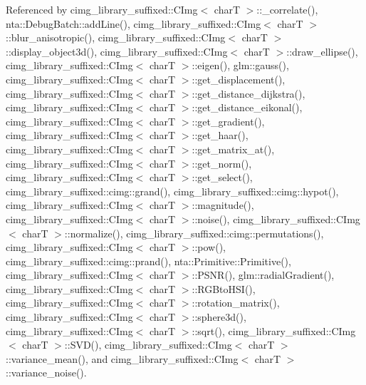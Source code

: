 Referenced by cimg\+\_\+library\+\_\+suffixed\+::\+C\+Img$<$ char\+T $>$\+::\+\_\+correlate(), nta\+::\+Debug\+Batch\+::add\+Line(), cimg\+\_\+library\+\_\+suffixed\+::\+C\+Img$<$ char\+T $>$\+::blur\+\_\+anisotropic(), cimg\+\_\+library\+\_\+suffixed\+::\+C\+Img$<$ char\+T $>$\+::display\+\_\+object3d(), cimg\+\_\+library\+\_\+suffixed\+::\+C\+Img$<$ char\+T $>$\+::draw\+\_\+ellipse(), cimg\+\_\+library\+\_\+suffixed\+::\+C\+Img$<$ char\+T $>$\+::eigen(), glm\+::gauss(), cimg\+\_\+library\+\_\+suffixed\+::\+C\+Img$<$ char\+T $>$\+::get\+\_\+displacement(), cimg\+\_\+library\+\_\+suffixed\+::\+C\+Img$<$ char\+T $>$\+::get\+\_\+distance\+\_\+dijkstra(), cimg\+\_\+library\+\_\+suffixed\+::\+C\+Img$<$ char\+T $>$\+::get\+\_\+distance\+\_\+eikonal(), cimg\+\_\+library\+\_\+suffixed\+::\+C\+Img$<$ char\+T $>$\+::get\+\_\+gradient(), cimg\+\_\+library\+\_\+suffixed\+::\+C\+Img$<$ char\+T $>$\+::get\+\_\+haar(), cimg\+\_\+library\+\_\+suffixed\+::\+C\+Img$<$ char\+T $>$\+::get\+\_\+matrix\+\_\+at(), cimg\+\_\+library\+\_\+suffixed\+::\+C\+Img$<$ char\+T $>$\+::get\+\_\+norm(), cimg\+\_\+library\+\_\+suffixed\+::\+C\+Img$<$ char\+T $>$\+::get\+\_\+select(), cimg\+\_\+library\+\_\+suffixed\+::cimg\+::grand(), cimg\+\_\+library\+\_\+suffixed\+::cimg\+::hypot(), cimg\+\_\+library\+\_\+suffixed\+::\+C\+Img$<$ char\+T $>$\+::magnitude(), cimg\+\_\+library\+\_\+suffixed\+::\+C\+Img$<$ char\+T $>$\+::noise(), cimg\+\_\+library\+\_\+suffixed\+::\+C\+Img$<$ char\+T $>$\+::normalize(), cimg\+\_\+library\+\_\+suffixed\+::cimg\+::permutations(), cimg\+\_\+library\+\_\+suffixed\+::\+C\+Img$<$ char\+T $>$\+::pow(), cimg\+\_\+library\+\_\+suffixed\+::cimg\+::prand(), nta\+::\+Primitive\+::\+Primitive(), cimg\+\_\+library\+\_\+suffixed\+::\+C\+Img$<$ char\+T $>$\+::\+P\+S\+N\+R(), glm\+::radial\+Gradient(), cimg\+\_\+library\+\_\+suffixed\+::\+C\+Img$<$ char\+T $>$\+::\+R\+G\+Bto\+H\+S\+I(), cimg\+\_\+library\+\_\+suffixed\+::\+C\+Img$<$ char\+T $>$\+::rotation\+\_\+matrix(), cimg\+\_\+library\+\_\+suffixed\+::\+C\+Img$<$ char\+T $>$\+::sphere3d(), cimg\+\_\+library\+\_\+suffixed\+::\+C\+Img$<$ char\+T $>$\+::sqrt(), cimg\+\_\+library\+\_\+suffixed\+::\+C\+Img$<$ char\+T $>$\+::\+S\+V\+D(), cimg\+\_\+library\+\_\+suffixed\+::\+C\+Img$<$ char\+T $>$\+::variance\+\_\+mean(), and cimg\+\_\+library\+\_\+suffixed\+::\+C\+Img$<$ char\+T $>$\+::variance\+\_\+noise().

